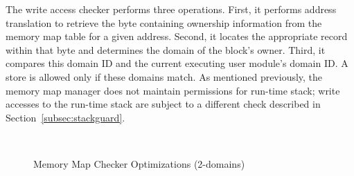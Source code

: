 The write access checker performs three operations.
%
First, it performs address translation to retrieve the byte containing
ownership information from the memory map table for a given address.
%
Second, it locates the appropriate record within that byte and determines
the domain of the block's owner.
%
Third, it compares this domain ID and the current executing user module's domain ID.
%
A store is allowed only if these domains match.
%
As mentioned previously, the memory map manager does not maintain
permissions for run-time stack;
%
write accesses to the run-time stack are subject to a different
check described in Section~\ref{subsec:stackguard}.
%

%
\begin{figure}[htpb]
 \centering
  \mbox{
    \hspace{0.2in}
  }
  \caption{Memory Map Checker Optimizations (2-domains)}
\end{figure}   
%
%
